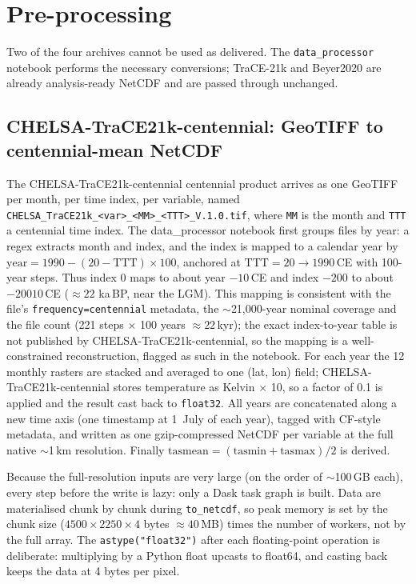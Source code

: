 \documentclass{isprs} %
\newcommand{\tabbr}[1]{\texttt{#1}}
\newcommand{\kaBP}{ka\,BP}
\begin{document}
\section{Pre-processing}
Two of the four archives cannot be used as delivered. The \tabbr{data\_processor} notebook performs the necessary conversions; TraCE-21k and Beyer2020 are already analysis-ready NetCDF and are passed through unchanged.

\subsection{CHELSA-TraCE21k-centennial: GeoTIFF to centennial-mean NetCDF}
The CHELSA-TraCE21k-centennial centennial product arrives as one GeoTIFF per month, per time index, per variable, named \tabbr{CHELSA\_TraCE21k\_<var>\_<MM>\_<TTT>\_V.1.0.tif}, where \tabbr{MM} is the month and \tabbr{TTT} a centennial time index. The data\_processor notebook first groups files by year: a regex extracts month and index, and the index is mapped to a calendar year by $\mathrm{year} = 1990 - (20 - \mathrm{TTT})\times100$, anchored at $\mathrm{TTT}=20 \rightarrow 1990$\,CE with 100-year steps. Thus index 0 maps to about year $-10$\,CE and index $-200$ to about $-20010$\,CE ($\approx 22$ \kaBP, near the LGM). This mapping is consistent with the file's \tabbr{frequency=centennial} metadata, the $\sim$21,000-year nominal coverage and the file count (221 steps $\times$ 100 years $\approx 22$\,kyr); the exact index-to-year table is not published by CHELSA-TraCE21k-centennial, so the mapping is a well-constrained reconstruction, flagged as such in the notebook. For each year the 12 monthly rasters are stacked and averaged to one (lat, lon) field; CHELSA-TraCE21k-centennial stores temperature as Kelvin $\times$ 10, so a factor of 0.1 is applied and the result cast back to \tabbr{float32}. All years are concatenated along a new time axis (one timestamp at 1~July of each year), tagged with CF-style metadata, and written as one gzip-compressed NetCDF per variable at the full native $\sim$1\,km resolution. Finally $\mathrm{tasmean} = (\mathrm{tasmin}+\mathrm{tasmax})/2$ is derived. \cite{giersch2026_paleoclimate_model_comparison}

Because the full-resolution inputs are very large (on the order of $\sim$100\,GB each), every step before the write is lazy: only a Dask task graph is built. Data are materialised chunk by chunk during \tabbr{to\_netcdf}, so peak memory is set by the chunk size ($4500\times2250\times4$ bytes $\approx 40$\,MB) times the number of workers, not by the full array. The \tabbr{astype("float32")} after each floating-point operation is deliberate: multiplying by a Python float upcasts to float64, and casting back keeps the data at 4 bytes per pixel.
\end{document}

